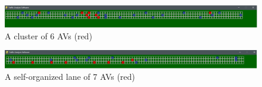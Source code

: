 \documentclass[oneside,letter,11pt]{article}
\begin{document}
\begin{figure}[H]
\centering
\hspace{-0.1cm}
  \includegraphics[width= 18cm]{cls.png}
  \vspace{-0.6cm}
  \caption{A cluster of 6 AVs (red)}
    \vspace{-0.2cm}
  \label{fig:cls0}
\end{figure}
\begin{figure}[H]
\centering
\hspace{-0.1cm}
  \includegraphics[width= 18cm]{clslane.png}
  \vspace{-0.6cm}
  \caption{A self-organized lane of 7 AVs (red)}
    \vspace{-0.2cm}
  \label{fig:cls}
\end{figure}
\end{document}
